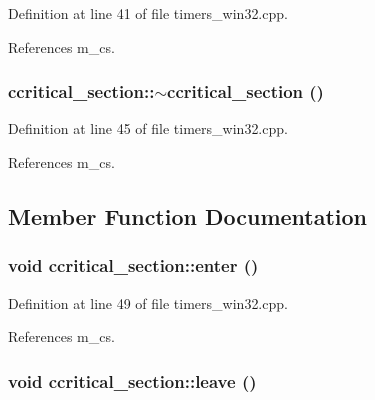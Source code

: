 Definition at line 41 of file timers\_\-win32.cpp.

References m\_\-cs.\hypertarget{classccritical__section_9afc8d8a935bb51b02e9ef9bc7241466}{
\subsubsection[$\sim$ccritical\_\-section]{\setlength{\rightskip}{0pt plus 5cm}ccritical\_\-section::$\sim$ccritical\_\-section ()}}
\label{classccritical__section_9afc8d8a935bb51b02e9ef9bc7241466}




Definition at line 45 of file timers\_\-win32.cpp.

References m\_\-cs.

\subsection{Member Function Documentation}
\hypertarget{classccritical__section_94af8f7f73229ecc82a303be7e2b0ad0}{
\subsubsection[enter]{\setlength{\rightskip}{0pt plus 5cm}void ccritical\_\-section::enter ()}}
\label{classccritical__section_94af8f7f73229ecc82a303be7e2b0ad0}




Definition at line 49 of file timers\_\-win32.cpp.

References m\_\-cs.\hypertarget{classccritical__section_e1f542404005a2f0696ced6c52a8ce3b}{
\subsubsection[leave]{\setlength{\rightskip}{0pt plus 5cm}void ccritical\_\-section::leave ()}}
\label{classccritical__section_e1f542404005a2f0696ced6c52a8ce3b}




